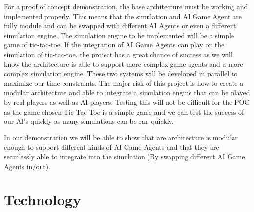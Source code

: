 \documentclass{article}
\begin{document}
For a proof of concept demonstration, the base architecture must be working and implemented properly. This means that the simulation and AI Game Agent are fully
module and can be swapped with different AI Agents or even a different simulation engine. The simulation engine to be implemented will be a simple game of tic-tac-toe.
If the integration of AI Game Agents can play on the simulation of tic-tac-toe, the project has a great chance of success as we will know the architecture is able to support
more complex game agents and a more complex simulation engine. These two systems will be developed in parallel to maximize our time constraints.
The major risk of this project is how to create a modular architecture and able to integrate a simulation engine that can be played by real players as well as AI players. Testing this will not be difficult for the POC as the game chosen Tic-Tac-Toe is a simple game and we can test the success of our AI's quickly as many simulations can be ran quickly.

In our demonstration we will be able to show that are architecture is modular enough to support different kinds of AI Game Agents and that they are seamlessly able to integrate into the simulation (By swapping different AI Game Agents in/out).
\section{Technology}
\end{document}
